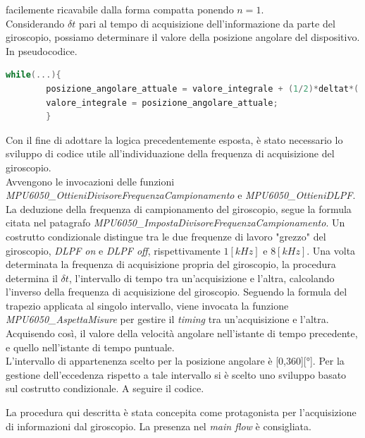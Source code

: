 \documentclass[11pt]{report}
\begin{document}
facilemente ricavabile dalla forma compatta ponendo $n=1$.\\
Considerando $\delta t$ pari al tempo di acquisizione dell'informazione da parte del giroscopio, possiamo determinare il valore della posizione angolare del dispositivo.\\
In pseudocodice.
\begin{lstlisting}[language = Cpp]
    while(...){
        posizione_angolare_attuale = valore_integrale + (1/2)*deltat*( vel_ang_ist_prec + vel_ang_ist_att);
        valore_integrale = posizione_angolare_attuale;
        }
\end{lstlisting}
Con il fine di adottare la logica precedentemente esposta, è stato necessario lo sviluppo di codice utile all'individuazione della frequenza di acquisizione del giroscopio.\\
Avvengono le invocazioni delle funzioni \textit{MPU6050\_OttieniDivisoreFrequenzaCampionamento} e \textit{MPU6050\_OttieniDLPF}.\\
La deduzione della frequenza di campionamento del giroscopio, segue la formula citata nel patagrafo \textit{MPU6050\_ImpostaDivisoreFrequenzaCampionamento}. %
Un costrutto condizionale distingue tra le due frequenze di lavoro "grezzo" del giroscopio, \textit{DLPF on} e \textit{DLPF off}, rispettivamente $1 [kHz]$ e $8 [kHz]$.
Una volta determinata la frequenza di acquisizione propria del giroscopio, la procedura determina il $\delta t$, l'intervallo di tempo tra un'acquisizione e l'altra, calcolando l'inverso della frequenza di acquisizione del giroscopio.
Seguendo la formula del trapezio applicata al singolo intervallo, viene invocata la funzione \textit{MPU6050\_AspettaMisure} per gestire il \textit{timing} tra un'acquisizione e l'altra. Acquisendo così, il valore della velocità angolare nell'istante di tempo precedente, e quello nell'istante di tempo puntuale.\\
L'intervallo di appartenenza scelto per la posizione angolare è [0,360][°]. Per la gestione dell'eccedenza rispetto a tale intervallo si è scelto uno sviluppo basato sul costrutto condizionale.
A seguire il codice.

La procedura qui descritta è stata concepita come protagonista per l'acquisizione di informazioni dal giroscopio. La presenza nel \textit{main flow} è consigliata.
\end{document}
